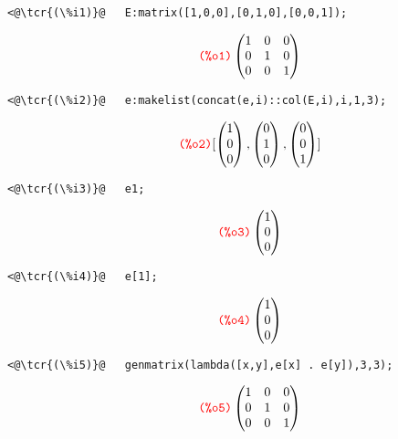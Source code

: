\documentclass[../Maxima_Workbook.tex]{subfiles}
\begin{document}
\lz \begin{small}
\color{blue}
\begin{lstlisting}
<@\tcr{(\%i1)}@   E:matrix([1,0,0],[0,1,0],[0,0,1]);
\end{lstlisting}
\vspace{-3.5mm} \[\tag*{\tcr{\ttfamily (\%o1)}} \begin{pmatrix} 1 & 0 & 0 \\ 0 & 1 & 0 \\ 0 & 0 & 1 \end{pmatrix} \]
\vspace{-6mm}\begin{lstlisting}
<@\tcr{(\%i2)}@   e:makelist(concat(e,i)::col(E,i),i,1,3);
\end{lstlisting}
\vspace{-3.5mm} \[\tag*{\tcr{\ttfamily (\%o2)}} [\begin{pmatrix} 1 \\ 0 \\ 0 \end{pmatrix}, \begin{pmatrix} 0 \\ 1 \\ 0 \end{pmatrix}, \begin{pmatrix} 0 \\ 0 \\ 1 \end{pmatrix}] \]
\vspace{-6mm}\begin{lstlisting}
<@\tcr{(\%i3)}@   e1;
\end{lstlisting}
\vspace{-3.5mm} \[\tag*{\tcr{\ttfamily (\%o3)}} \begin{pmatrix} 1 \\ 0 \\ 0 \end{pmatrix} \]
\vspace{-6mm}\begin{lstlisting}
<@\tcr{(\%i4)}@   e[1];
\end{lstlisting}
\vspace{-3.5mm} \[\tag*{\tcr{\ttfamily (\%o4)}} \begin{pmatrix} 1 \\ 0 \\ 0 \end{pmatrix} \]
\vspace{-5mm}\begin{lstlisting}
<@\tcr{(\%i5)}@   genmatrix(lambda([x,y],e[x] . e[y]),3,3);
\end{lstlisting}
\vspace{-3mm} \[\tag*{\tcr{\ttfamily (\%o5)}} \begin{pmatrix} 1 & 0 & 0 \\ 0 & 1 & 0 \\ 0 & 0 & 1 \end{pmatrix} \]
\color{black}
\end{small}
\end{document}
